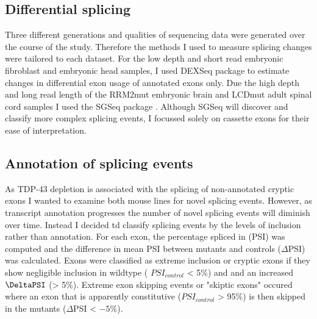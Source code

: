\subsection{Differential splicing}
Three different generations and qualities of sequencing data were generated over the course of the study.  Therefore the methods I  used  to  measure  splicing  changes  were  tailored to each dataset. 
For the low depth and short read embryonic fibroblast and  embryonic head samples, I used DEXSeq package \citep{Anders2012} to estimate changes in differential exon usage of annotated exons only.
Due the high depth and long read length of the RRM2mut embryonic brain and LCDmut adult spinal cord samples I used the SGSeq package \citep{Goldstein2016}.
Although SGSeq will discover and classify more complex splicing events, I focussed solely on cassette exons for their ease of interpretation.

\subsection{Annotation of splicing events}

As TDP-43 depletion is associated with the splicing of non-annotated cryptic exons \citep{Ling2015} I wanted to examine both mouse lines for  novel splicing events.
However, as transcript annotation progresses the number of novel splicing events will diminish over time. 
Instead  I decided td classify splicing events by the levels of inclusion rather than annotation. 
For each exon, the percentage spliced in (PSI) was computed and the difference in mean PSI between mutants and controls ($\Delta$PSI) was calculated.
Exons were classified as extreme inclusion or cryptic exons if they show negligible inclusion in wildtype ( $PSI_{control}$ < 5\%) and and an increased $\DeltaPSI$ (> 5\%).
Extreme exon skipping events or "skiptic exons" occured where an exon that is apparently constitutive ($PSI_{control}$ > 95\%) is then skipped in the mutants ($\Delta$PSI < $-5$\%).

